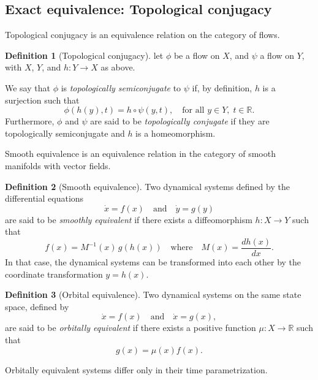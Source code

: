 \documentclass{article}
\theoremstyle{definition} \newtheorem{definition}{Definition}  \newtheorem{example}{Example}
\theoremstyle{remark} \newtheorem{remark}{Remark}
\newcounter{ct}
\begin{document}
\subsection{Exact equivalence: Topological conjugacy}\label{sec:top_conj}

Topological conjugacy is an equivalence relation on the category of flows. %
\begin{definition}[Topological conjugacy]\label{def:top_conj}
let $\phi$ be a flow on $X$, and $\psi$ a flow on $Y$, with $X$, $Y$, and $h\colon Y \to X$ as above.

We say that $\phi$ is \emph{topologically semiconjugate} to $\psi$ if, by definition, $h$ is a surjection such that
\[
\phi(h(y), t) = h \circ \psi(y, t), \quad \text{for all } y \in Y, \; t \in \mathbb{R}.
\]
Furthermore, $\phi$ and $\psi$ are said to be \emph{topologically conjugate} if they are topologically semiconjugate and $h$ is a homeomorphism.
\end{definition}

Smooth equivalence is an equivalence relation in the category of smooth manifolds with vector fields. %
\begin{definition}[Smooth equivalence]\label{def:smooth_equivalence}
Two dynamical systems defined by the differential equations 
\[
\dot{x} = f(x) \quad \text{and} \quad \dot{y} = g(y)
\]
are said to be \emph{smoothly equivalent} if there exists a diffeomorphism \( h \colon X \to Y \) such that
\[
f(x) = M^{-1}(x) \, g(h(x)) \quad \text{where} \quad M(x) = \frac{d h(x)}{d x}.
\]
In that case, the dynamical systems can be transformed into each other by the coordinate transformation \( y = h(x) \).
\end{definition}

\begin{definition}[Orbital equivalence]
Two dynamical systems on the same state space, defined by 
\[
\dot{x} = f(x) \quad \text{and} \quad \dot{x} = g(x),
\]
are said to be \emph{orbitally equivalent} if there exists a positive function \( \mu \colon X \to \mathbb{R} \) such that
\[
g(x) = \mu(x) f(x).
\]
\end{definition}
Orbitally equivalent systems differ only in their time parametrization.
\end{document}
